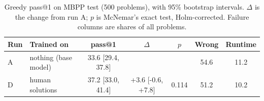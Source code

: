 \begin{table}[t]
\caption{Greedy pass@1 on MBPP test (500 problems), with 95\% bootstrap intervals. $\Delta$ is the change from run A; $p$ is McNemar's exact test, Holm-corrected. Failure columns are shares of all problems.}
\label{tab:results}
\centering\small
\begin{tabular}{llccccc}
\toprule
Run & Trained on & pass@1 & $\Delta$ & $p$ & Wrong & Runtime \\
\midrule
A & nothing (base model) & 33.6 [29.4, 37.8] &  &  & 54.6 & 11.2 \\
D & human solutions & 37.2 [33.0, 41.4] & +3.6 [-0.6, +7.8] & 0.114 & 51.2 & 10.2 \\
\bottomrule
\end{tabular}
\end{table}
